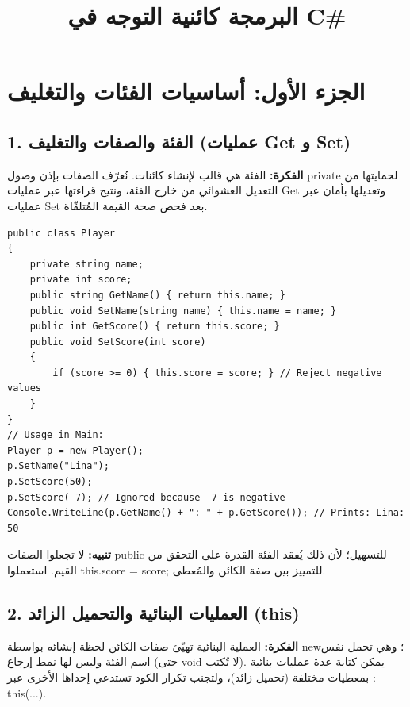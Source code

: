 \documentclass[14pt]{extarticle}
\title{البرمجة كائنية التوجه في \textenglish{C\#}}
\begin{document}
\maketitle
\thispagestyle{fancy}

\section*{الجزء الأول: أساسيات الفئات والتغليف}

\subsection*{1. الفئة والصفات والتغليف (عمليات \textenglish{Get} و \textenglish{Set})}
\textbf{الفكرة:} الفئة هي قالب لإنشاء كائنات. نُعرّف الصفات بإذن وصول \textenglish{private} لحمايتها من التعديل العشوائي من خارج الفئة، ونتيح قراءتها عبر عمليات \textenglish{Get} وتعديلها بأمان عبر عمليات \textenglish{Set} بعد فحص صحة القيمة المُتلقّاة.

\begin{boxCode}
\begin{english}
\begin{verbatim}
public class Player
{
    private string name;
    private int score;
    public string GetName() { return this.name; }
    public void SetName(string name) { this.name = name; }
    public int GetScore() { return this.score; }
    public void SetScore(int score)
    {
        if (score >= 0) { this.score = score; } // Reject negative values
    }
}
// Usage in Main:
Player p = new Player();
p.SetName("Lina");
p.SetScore(50);
p.SetScore(-7); // Ignored because -7 is negative
Console.WriteLine(p.GetName() + ": " + p.GetScore()); // Prints: Lina: 50
\end{verbatim}
\end{english}
\end{boxCode}

\textbf{تنبيه:} لا تجعلوا الصفات \textenglish{public} للتسهيل؛ لأن ذلك يُفقد الفئة القدرة على التحقق من القيم. استعملوا \textenglish{this.score = score;} للتمييز بين صفة الكائن والمُعطى.

\filbreak
\subsection*{2. العمليات البنائية والتحميل الزائد (\textenglish{this})}
\textbf{الفكرة:} العملية البنائية تهيّئ صفات الكائن لحظة إنشائه بواسطة \textenglish{new}؛ وهي تحمل نفس اسم الفئة وليس لها نمط إرجاع (حتى \textenglish{void} لا تُكتب). يمكن كتابة عدة عمليات بنائية بمعطيات مختلفة (تحميل زائد)، ولتجنب تكرار الكود تستدعي إحداها الأخرى عبر \textenglish{: this(...)}.
\end{document}
